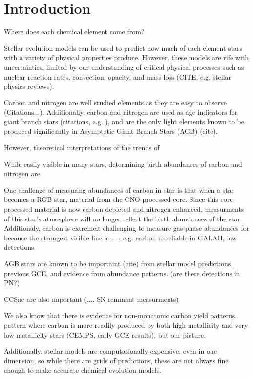 \documentclass[12pt,oneside]{book}
\begin{document}


\chapter{Introduction}


Where does each chemical element come from? 

Stellar evolution models can be used to predict how much of each element stars with a variety of physical properties produce. However, these models are rife with uncertainties, limited by our understanding of critical physical processes such as nuclear reaction rates, convection, opacity, and mass loss (CITE, e.g. stellar physics reviews). 

Carbon and nitrogen are well studied elements as they are easy to observe (Citations...). Additionally, carbon and nitrogen are used as age indicators for giant branch stars (citations, e.g. \cite{fiorenzo+21}), and are the only light elements known to be produced significantly in Asymptotic Giant Branch Stars (AGB) (cite).

However, theoretical interpretations of the trends of 

While easily visible in many stars, determining birth abundances of carbon and nitrogen are 

One challenge of measuring abundances of carbon in star is that when a star becomes a RGB star, material from the CNO-processed core. Since this core-processed material is now carbon depleted and nitrogen enhanced, measurments of this star's atmosphere will no longer reflect the birth abundances of the star.
Additionaly, carbon is extremelt challenging to measure gas-phase abundances for because the strongest visible line is ...., e.g. carbon unreliable in GALAH, low detections.

AGB stars are known to be importaint (cite) from stellar model predictions, previous GCE, and evidence from abundance patterns. (are there detections in PN?)

CCSne are also important (.... SN reminant measurments)

We also know that there is evidence for non-monatonic carbon yield patterns. 
pattern where carbon is more readily produced by both high metallicity and very low metallicity stars (CEMPS, early GCE results), but our picture.

Additionally, stellar models are computationally expensive, even in one dimension, so while there are grids of predictions, these are not always fine enough to make accurate chemical evolution models. 
\end{document}
